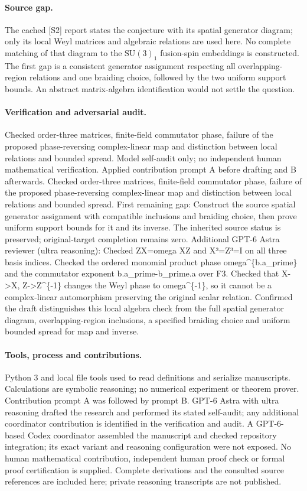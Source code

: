 \documentclass[11pt]{article}
\begin{document}
\paragraph{Source gap.} The cached [S2] report states the conjecture with its spatial generator diagram; only its local Weyl matrices and algebraic relations are used here. No complete matching of that diagram to the \(\mathrm{SU}(3)_1\) fusion-spin embeddings is constructed. The first gap is a consistent generator assignment respecting all overlapping-region relations and one braiding choice, followed by the two uniform support bounds. An abstract matrix-algebra identification would not settle the question.

\paragraph{Verification and adversarial audit.}
Checked order-three matrices, finite-field commutator phase, failure of the proposed phase-reversing complex-linear map and distinction between local relations and bounded spread. Model self-audit only; no independent human mathematical verification. Applied contribution prompt A before drafting and B afterwards. Checked order-three matrices, finite-field commutator phase, failure of the proposed phase-reversing complex-linear map and distinction between local relations and bounded spread. First remaining gap: Construct the source spatial generator assignment with compatible inclusions and braiding choice, then prove uniform support bounds for it and its inverse. The inherited source status is preserved; original-target completion remains zero. Additional GPT-6 Astra reviewer (ultra reasoning): Checked ZX=omega XZ and X³=Z³=I on all three basis indices. Checked the ordered monomial product phase omega\textasciicircum{}\{b.a\_prime\} and the commutator exponent b.a\_prime-b\_prime.a over F3. Checked that X->X, Z->Z\textasciicircum{}\{-1\} changes the Weyl phase to omega\textasciicircum{}\{-1\}, so it cannot be a complex-linear automorphism preserving the original scalar relation. Confirmed the draft distinguishes this local algebra check from the full spatial generator diagram, overlapping-region inclusions, a specified braiding choice and uniform bounded spread for map and inverse.

\paragraph{Tools, process and contributions.}
Python 3 and local file tools used to read definitions and serialize manuscripts. Calculations are symbolic reasoning; no numerical experiment or theorem prover. Contribution prompt A was followed by prompt B. GPT-6 Astra with ultra reasoning drafted the research and performed its stated self-audit; any additional coordinator contribution is identified in the verification and audit. A GPT-6-based Codex coordinator assembled the manuscript and checked repository integration; its exact variant and reasoning configuration were not exposed. No human mathematical contribution, independent human proof check or formal proof certification is supplied. Complete derivations and the consulted source references are included here; private reasoning transcripts are not published.
\end{document}
